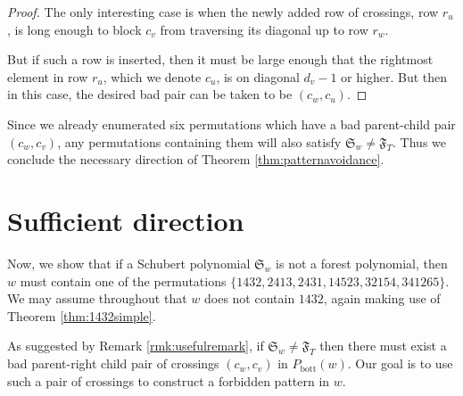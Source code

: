 \documentclass{article}
\theoremstyle{definition} %
\begin{document}
\begin{proof}
The only interesting case is when the newly added row of crossings, row $r_u$, is long enough to block $c_v$ from traversing its diagonal up to row $r_w$. 

But if such a row is inserted, then it must be large enough that the rightmost element in row $r_u$, which we denote $c_u$, is on diagonal $d_v-1$ or higher. But then in this case, the desired bad pair can be taken to be $(c_w, c_u)$. 

\end{proof}
Since we already enumerated six permutations which have a bad parent-child pair $(c_w,c_v)$, any permutations containing them will also satisfy $\mathfrak{S}_w \neq \mathfrak{F}_T$. Thus we conclude the necessary direction of Theorem \ref{thm:patternavoidance}.

\section{Sufficient direction}

Now, we show that if a Schubert polynomial $\mathfrak{S}_w$ is not a forest polynomial, then $w$ must contain one of the permutations $\{1432, 2413, 2431, 14523, 32154, 341265\}$. We may assume throughout that $w$ does not contain $1432$, again making use of Theorem \ref{thm:1432simple}. 

As suggested by Remark \ref{rmk:usefulremark}, if $\mathfrak{S}_w \neq \mathfrak{F}_T$ then there must exist a bad parent-right child pair of crossings $(c_w, c_v)$ in $P_{\text{bott}}(w)$. Our goal is to use such a pair of crossings to construct a forbidden pattern in $w$. 
\end{document}
